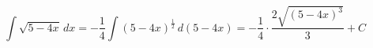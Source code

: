 \documentclass[../rgr1.tex]{subfiles}
\begin{document}
\Solution


\begin{dmath}
	\int\sqrt{5-4x} \,dx =
	-\frac{1}{4}\int (5-4x)^{\frac{1}{2}} \,d(5-4x) = -\frac{1}{4} \cdot \frac{ 2\sqrt{(5-4x)^3} }{3} + C
\end{dmath}

\end{document}
